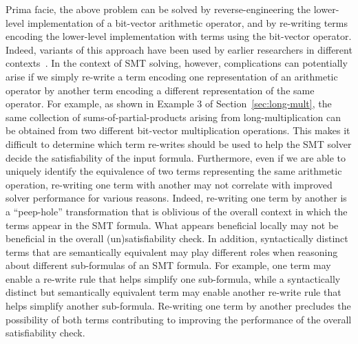 \vspace{0.2 cm}
Prima facie, the above problem can be solved by reverse-engineering
the lower-level implementation of a bit-vector arithmetic operator,
and by re-writing terms encoding the lower-level implementation with
terms using the bit-vector operator.  Indeed, variants of this
approach have been used by earlier researchers in different
contexts~\cite{kunz,ciesielski,kolbl,reveng,earlier-pat-match-synopsys}.
In the context of SMT solving, however, complications can potentially
arise if we simply re-write a term encoding one representation of an
arithmetic operator by another term encoding a different
representation of the same operator. For example, as shown in Example
$3$ of Section~\ref{sec:long-mult}, the same collection of
sums-of-partial-products arising from long-multiplication can be
obtained from two different bit-vector multiplication operations.
This makes it difficult to determine which term re-writes should be
used to help the SMT solver decide the satisfiability of the input
formula.  Furthermore, even if we are able to uniquely identify the
equivalence of two terms representing the same arithmetic operation,
re-writing one term with another may not correlate with improved solver
performance for various reasons.  Indeed, re-writing one term by
another is a ``peep-hole'' transformation that is oblivious of the
overall context in which the terms appear in the SMT formula.  What
appears beneficial locally may not be beneficial in the overall
(un)satisfiability check.  In addition, syntactically distinct terms
that are semantically equivalent may play different roles when
reasoning about different sub-formulas of an SMT formula.  For
example, one term may enable a re-write rule that helps simplify one
sub-formula, while a syntactically distinct but semantically
equivalent term may enable another re-write rule that helps simplify
another sub-formula. Re-writing one term by another precludes the
possibility of both terms contributing to improving the performance of
the overall satisfiability check.

